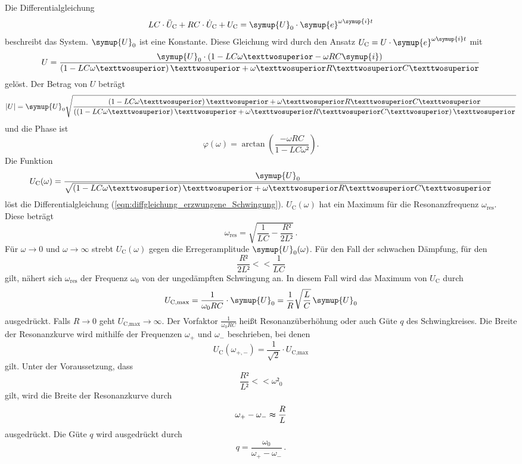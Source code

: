 Die Differentialgleichung 
\begin{equation}
    \label{eqn:diffgleichung_erzwungene_Schwingung}
    LC \cdot \ddot{U}_{\text{C}} + RC \cdot \dot{U}_{\text{C}} + U_{\text{C}} = \symup{U}_0 \cdot \symup{e}^{\omega \symup{i} t}
\end{equation}
beschreibt das System. $\symup{U}_0$ ist eine Konstante. Diese Gleichung wird durch den Ansatz $U_{\text{C}} = U \cdot \symup{e}^{\omega \symup{i}t}$ mit
\begin{equation}
    U = \frac{\symup{U}_0 \cdot \left(1 - LC \omega² - \omega R C \symup{i}\right)}{\left(1 - LC \omega²\right)² + \omega² R² C²}
\end{equation}
gelöst. Der Betrag von $U$ beträgt 
\begin{equation}
    |U| = \symup{U}_0 \sqrt{\frac{\left(1 - LC \omega²\right)² + \omega² R² C²}{\left(\left(1 - LC\omega²\right)² + \omega² R² C²\right)²}} 
\end{equation}
und die Phase ist
\begin{equation}
    \varphi (\omega) = \arctan{\left(\frac{- \omega R C}{1 - L C \omega²} \right)}. 
\end{equation}
Die Funktion 
\begin{equation}
    U_{\text{C}}(\omega) = \frac{\symup{U}_0}{\sqrt{\left(1 - LC \omega²\right)² + \omega² R² C²}}
    \label{eqn:Theoriekurve}
\end{equation}
löst die Differentialgleichung (\ref{eqn:diffgleichung_erzwungene_Schwingung}).
$U_{\text{C}}(\omega)$ hat ein Maximum für die Resonanzfrequenz $\omega_{\text{res}}$.
Diese beträgt
$$\omega_{\text{res}} = \sqrt{\frac{1}{LC} - \frac{R²}{2L²}}\, .$$
Für $\omega \rightarrow 0$ und $\omega \rightarrow \infty$ strebt $U_{\text{C}}(\omega)$
gegen die Erregeramplitude $\symup{U}_{\text{0}}(\omega)$.
Für den Fall der schwachen Dämpfung, für den 
$$\frac{R²}{2L²} << \frac{1}{LC}$$
gilt, nähert sich $\omega_{\text{res}}$ der Frequenz $\omega_0$ von der ungedämpften Schwingung an. 
In diesem Fall wird das Maximum von $U_{\text{C}}$ durch 
$$U_{\text{C,max}} =  \frac{1}{\omega_0 R C} \cdot \symup{U}_0 = \frac{1}{R}\sqrt{\frac{L}{C}} \, \symup{U}_0$$
ausgedrückt. 
Falls $R \rightarrow 0$ geht $U_{\text{C,max}} \rightarrow \infty$. Der Vorfaktor 
$\frac{1}{\omega_0 R C}$ heißt Resonanzüberhöhung oder auch Güte $q$ des Schwingkreises.
Die Breite der Resonanzkurve wird mithilfe der Frequenzen $\omega_+$ und $\omega_-$ beschrieben, 
bei denen 
$$U_{\text{C}}(\omega_{+,-}) = \frac{1}{\sqrt{2}} \cdot U_{\text{C,max}}$$
gilt. Unter der Voraussetzung, dass 
$$\frac{R²}{L²} << \omega²_0$$
gilt, wird die Breite der Resonanzkurve durch 
\begin{equation}
\omega_+ - \omega_- \thickapprox \frac{R}{L}
\label{eqn:BreiteResonanzkurve}
\end{equation}
ausgedrückt.
Die Güte $q$ wird ausgedrückt durch
\begin{equation}
    q = \frac{\omega_0}{\omega_+ - \omega_- } \, .
    \label{eqn:Güte}
\end{equation}
